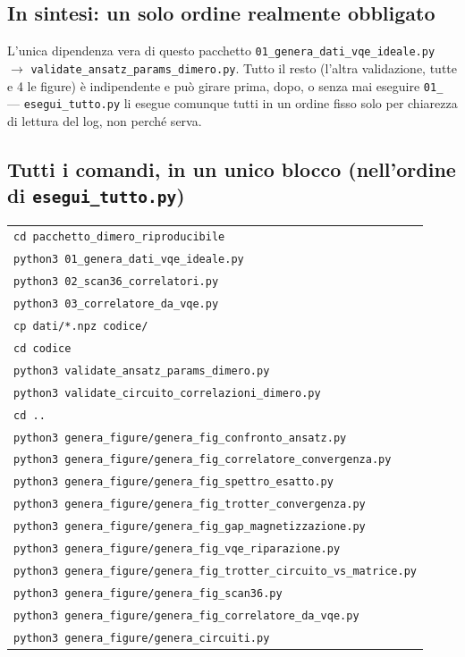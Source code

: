 \documentclass[11pt,a4paper]{article}
\newcommand{\code}[1]{\texttt{\small #1}}
\begin{document}
\subsection{In sintesi: un solo ordine realmente obbligato}

\begin{okbox}{L'unica dipendenza vera di questo pacchetto}
\code{01\_genera\_dati\_vqe\_ideale.py} $\to$
\code{validate\_ansatz\_params\_dimero.py}. Tutto il resto (l'altra
validazione, tutte e 4 le figure) è indipendente e può girare prima,
dopo, o senza mai eseguire \code{01\_} --- \code{esegui\_tutto.py} li
esegue comunque tutti in un ordine fisso solo per chiarezza di lettura
del log, non perché serva.
\end{okbox}

\subsection{Tutti i comandi, in un unico blocco (nell'ordine di \texttt{esegui\_tutto.py})}

\begin{keyeq}
\centering
\begin{tabular}{@{}l@{}}
\code{cd pacchetto\_dimero\_riproducibile}\\
\code{python3 01\_genera\_dati\_vqe\_ideale.py}\\
\code{python3 02\_scan36\_correlatori.py}\\
\code{python3 03\_correlatore\_da\_vqe.py}\\
\code{cp dati/*.npz codice/}\\
\code{cd codice}\\
\code{python3 validate\_ansatz\_params\_dimero.py}\\
\code{python3 validate\_circuito\_correlazioni\_dimero.py}\\
\code{cd ..}\\
\code{python3 genera\_figure/genera\_fig\_confronto\_ansatz.py}\\
\code{python3 genera\_figure/genera\_fig\_correlatore\_convergenza.py}\\
\code{python3 genera\_figure/genera\_fig\_spettro\_esatto.py}\\
\code{python3 genera\_figure/genera\_fig\_trotter\_convergenza.py}\\
\code{python3 genera\_figure/genera\_fig\_gap\_magnetizzazione.py}\\
\code{python3 genera\_figure/genera\_fig\_vqe\_riparazione.py}\\
\code{python3 genera\_figure/genera\_fig\_trotter\_circuito\_vs\_matrice.py}\\
\code{python3 genera\_figure/genera\_fig\_scan36.py}\\
\code{python3 genera\_figure/genera\_fig\_correlatore\_da\_vqe.py}\\
\code{python3 genera\_figure/genera\_circuiti.py}\\
\end{tabular}
\end{keyeq}
\end{document}
